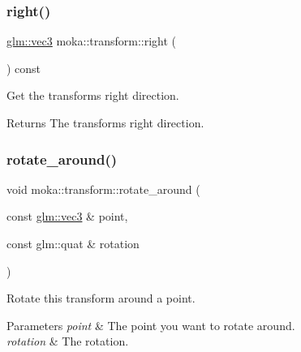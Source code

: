 \mbox{\label{classmoka_1_1transform_a540766efeb8efe854972ec5f8fb41731}} 
\subsubsection{\texorpdfstring{right()}{right()}}
{\footnotesize\ttfamily \mbox{\hyperlink{namespacemoka_aed2224bc0e5b79e57a8975ded94ee1aaa97ade28e93c0de60adc075bdbe07ca36}{glm\+::vec3}} moka\+::transform\+::right (\begin{DoxyParamCaption}{ }\end{DoxyParamCaption}) const}



Get the transform\textquotesingle{}s right direction. 

\begin{DoxyReturn}{Returns}
The transform\textquotesingle{}s right direction. 
\end{DoxyReturn}
\mbox{\label{classmoka_1_1transform_af21853480a4f772450364f8f39687054}} 
\subsubsection{\texorpdfstring{rotate\_around()}{rotate\_around()}\hspace{0.1cm}{\footnotesize\ttfamily [1/2]}}
{\footnotesize\ttfamily void moka\+::transform\+::rotate\+\_\+around (\begin{DoxyParamCaption}\item[{const \mbox{\hyperlink{namespacemoka_aed2224bc0e5b79e57a8975ded94ee1aaa97ade28e93c0de60adc075bdbe07ca36}{glm\+::vec3}} \&}]{point,  }\item[{const glm\+::quat \&}]{rotation }\end{DoxyParamCaption})}



Rotate this transform around a point. 


\begin{DoxyParams}{Parameters}
{\em point} & The point you want to rotate around. \\
\hline
{\em rotation} & The rotation. \\
\hline
\end{DoxyParams}
\mbox{\label{classmoka_1_1transform_a1ff4249932d7b23580834c1ea0bd8717}} 
